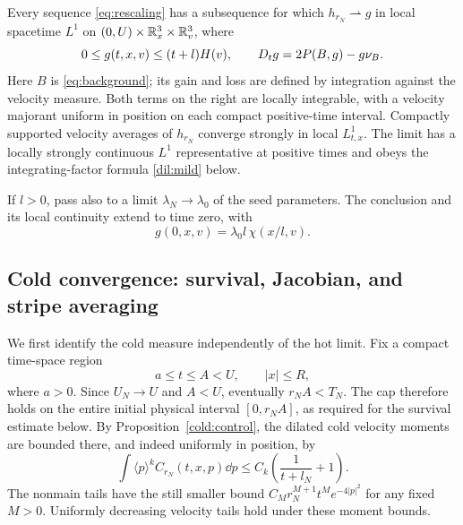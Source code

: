 \begin{proposition}\label{prop:blowup-limit}
Every sequence \eqref{eq:rescaling} has a subsequence for which
\(h_{r_N}\rightharpoonup g\) in local spacetime \(L^1\) on
\((0,U)\times\mathbb R^3_x\times\mathbb R^3_v\), where
\begin{equation}\label{eq:limit-equation}
0\leq g(t,x,v)\leq(t+l)H(v),\qquad
D_t g=2P(B,g)-g\nu_B.
\end{equation}
Here \(B\) is \eqref{eq:background}; its gain and loss are defined by
integration against the velocity measure. Both terms on the right are
locally integrable, with a velocity majorant uniform in position on
each compact positive-time interval. Compactly supported velocity
averages of \(h_{r_N}\) converge strongly in local \(L^1_{t,x}\).
The limit has a locally strongly continuous \(L^1\) representative
at positive times and obeys the integrating-factor formula
\eqref{dil:mild} below.

If \(l>0\), pass also to a limit \(\lambda_N\to\lambda_0\) of the
seed parameters. The conclusion and its local continuity extend to
time zero, with
\begin{equation}\label{dil:initial-trace}
g(0,x,v)=\lambda_0 l\,\chi(x/l,v).
\end{equation}
\end{proposition}

\subsection{Cold convergence: survival, Jacobian, and stripe averaging}

We first identify the cold measure independently of the hot limit.
Fix a compact time-space region
\[
a\leq t\leq A<U,\qquad |x|\leq R,
\]
where \(a>0\). Since \(U_N\to U\) and \(A<U\), eventually
\(r_NA<T_N\). The cap therefore holds on the entire initial
physical interval \([0,r_NA]\), as required for the survival
estimate below.
By Proposition~\ref{cold:control}, the dilated
cold velocity moments are bounded there, and indeed uniformly in
position, by
\begin{equation}\label{dil:cold-moment-bound}
\int\langle p\rangle^k C_{r_N}(t,x,p)\dd p
\leq C_k\left(\frac1{t+l_N}+1\right).
\end{equation}
The nonmain tails have the still smaller bound
\(C_M r_N^{M+1}t^Me^{-4|p|^2}\) for any fixed \(M>0\).
Uniformly decreasing velocity tails hold under these moment bounds.

